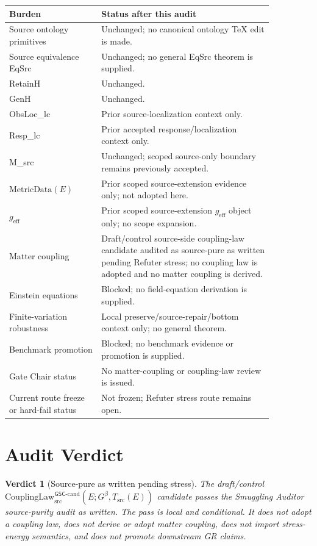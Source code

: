 \documentclass[11pt]{article}
\newcommand{\Gbeta}{G^\beta}
\newcommand{\geff}{g_{\mathrm{eff}}}
\newcommand{\CouplingLaw}{\mathrm{CouplingLaw}^{\mathsf{GSC}\mbox{-}\mathrm{cand}}_{\mathrm{src}}}
\newcommand{\MetricData}{\mathrm{MetricData}}
\newtheorem{verdict}{Verdict}
\begin{document}
\begin{longtable}{p{0.30\linewidth}p{0.56\linewidth}}
\toprule
Burden & Status after this audit \\
\midrule
Source ontology primitives & Unchanged; no canonical ontology TeX edit is made. \\
Source equivalence EqSrc & Unchanged; no general EqSrc theorem is supplied. \\
RetainH & Unchanged. \\
GenH & Unchanged. \\
ObsLoc\_lc & Prior source-localization context only. \\
Resp\_lc & Prior accepted response/localization context only. \\
M\_src & Unchanged; scoped source-only boundary remains previously accepted. \\
\(\MetricData(E)\) & Prior scoped source-extension evidence only; not adopted here. \\
\(\geff\) & Prior scoped source-extension \(\geff\) object only; no scope expansion. \\
Matter coupling & Draft/control source-side coupling-law candidate audited as source-pure as written pending Refuter stress; no coupling law is adopted and no matter coupling is derived. \\
Einstein equations & Blocked; no field-equation derivation is supplied. \\
Finite-variation robustness & Local preserve/source-repair/bottom context only; no general theorem. \\
Benchmark promotion & Blocked; no benchmark evidence or promotion is supplied. \\
Gate Chair status & No matter-coupling or coupling-law review is issued. \\
Current route freeze or hard-fail status & Not frozen; Refuter stress route remains open. \\
\bottomrule
\end{longtable}

\section{Audit Verdict}

\begin{verdict}[Source-pure as written pending stress]
The draft/control
\(\CouplingLaw(E;\Gbeta,T_{\mathrm{src}}(E))\) candidate passes the
Smuggling Auditor source-purity audit as written. The pass is local and
conditional. It does not adopt a coupling law, does not derive or adopt matter
coupling, does not import stress-energy semantics, and does not promote
downstream GR claims.
\end{verdict}
\end{document}

